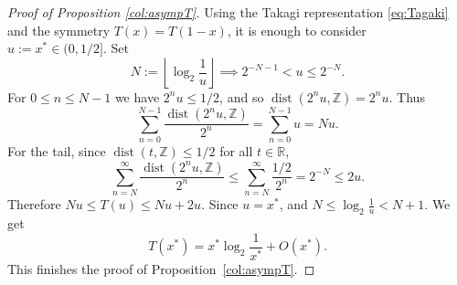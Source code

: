 \documentclass[11pt]{amsart}
\newtheorem{corollary}[theorem]{Corollary}
\theoremstyle{definition}
\renewcommand{\1}{{\mathbbm{1}}}
\begin{document}

\begin{proof}[Proof of Proposition \ref{col:asympT}]
Using the Takagi representation \eqref{eq:Tagaki}
and the symmetry $T(x)=T(1-x)$, it is enough to consider
$
u:=x^*\in(0,1/2].
$
Set
$$
N:=\left\lfloor \log_2\frac{1}{u}\right\rfloor\implies 2^{-N-1}<u\le 2^{-N}.
$$
For $0\le n\le N-1$ we have $2^n u\le 1/2$, and so
$
\operatorname{dist}(2^n u,\mathbb Z)=2^n u.
$
Thus
$$
\sum_{n=0}^{N-1}\frac{\operatorname{dist}(2^n u,\mathbb Z)}{2^n}
=
\sum_{n=0}^{N-1}u
=
Nu.
$$
For the tail, since $\operatorname{dist}(t,\mathbb Z)\le 1/2$ for all $t\in\mathbb R$,
$$
\sum_{n=N}^\infty \frac{\operatorname{dist}(2^n u,\mathbb Z)}{2^n}
\le
\sum_{n=N}^\infty \frac{1/2}{2^n}
=
2^{-N}
\le 2u.
$$
Therefore
$
Nu\le T(u)\le Nu+2u.
$
Since $u=x^*$, and
$
N\le \log_2\frac{1}{u}<N+1.
$
We get
$$
T(x^*)= x^*\log_2\frac{1}{x^*}+O(x^*) .
$$
This finishes the proof of Proposition~\ref{col:asympT}.
\end{proof}



\end{document}
